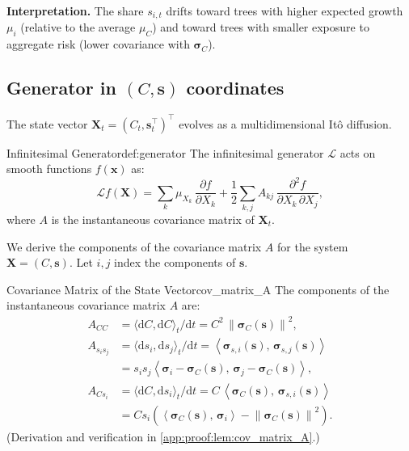 \documentclass[11pt,letterpaper,oneside]{article}
\numberwithin{equation}{section}
\newcommand{\1}{\mathbf{1}}
\newcommand{\diff}{\mathrm{d}}
\newcommand{\norm}[1]{\left\lVert #1\right\rVert}
\newcommand{\ip}[2]{\left\langle #1,\,#2\right\rangle}
\begin{document}
\begin{tcolorbox}[didacticstyle]
\textbf{Interpretation.} The share $s_{i,t}$ drifts toward trees with higher expected growth $\mu_i$ (relative to the average $\mu_C$) and toward trees with smaller exposure to aggregate risk (lower covariance with $\bm{\sigma}_C$).

\end{tcolorbox}

\subsection{Generator in $(C,\bm{s})$ coordinates}
\medskip
The state vector $\bm{X}_t = (C_t, \bm{s}_t^{\top})^{\top}$ evolves as a multidimensional It\^o diffusion.

\begin{definition}{Infinitesimal Generator}{def:generator}
The infinitesimal generator $\mathcal{L}$ acts on smooth functions $f(\bm{x})$ as:
\[
  \mathcal{L}f(\bm{X}) = \sum_{k} \mu_{X_k} \,\frac{\partial f}{\partial X_k} + \frac12 \sum_{k,j} A_{kj} \,\frac{\partial^2 f}{\partial X_k \, \partial X_j},
\]
where $A$ is the instantaneous covariance matrix of $\bm{X}_t$.
\end{definition}

We derive the components of the covariance matrix $A$ for the system $\bm{X}=(C,\bm{s})$. Let $i,j$ index the components of $\bm{s}$.

\begin{lemma}{Covariance Matrix of the State Vector}{cov_matrix_A}
The components of the instantaneous covariance matrix $A$ are:
\begin{align}
  A_{CC} &= \langle \diff C, \diff C \rangle_t / \diff t = C^2 \,
\norm{\bm{\sigma}_C(\bm{s})}^2, \\
  A_{s_i s_j} &= \langle \diff s_i, \diff s_j \rangle_t / \diff t = \ip{\bm{\sigma}_{s,i}(\bm{s})}{\bm{\sigma}_{s,j}(\bm{s})} \\
    &= s_i s_j \ip{\bm{\sigma}_i - \bm{\sigma}_C(\bm{s})}{\bm{\sigma}_j - \bm{\sigma}_C(\bm{s})}, \\
  A_{C s_i} &= \langle \diff C, \diff s_i \rangle_t / \diff t = C \,\ip{\bm{\sigma}_C(\bm{s})}{\bm{\sigma}_{s,i}(\bm{s})} \\
    &= C s_i \left(\ip{\bm{\sigma}_C(\bm{s})}{\bm{\sigma}_i} - 
\norm{\bm{\sigma}_C(\bm{s})}^2\right).
\end{align}
(Derivation and verification in \cref{app:proof:lem:cov_matrix_A}.)
\end{lemma}
\end{document}
